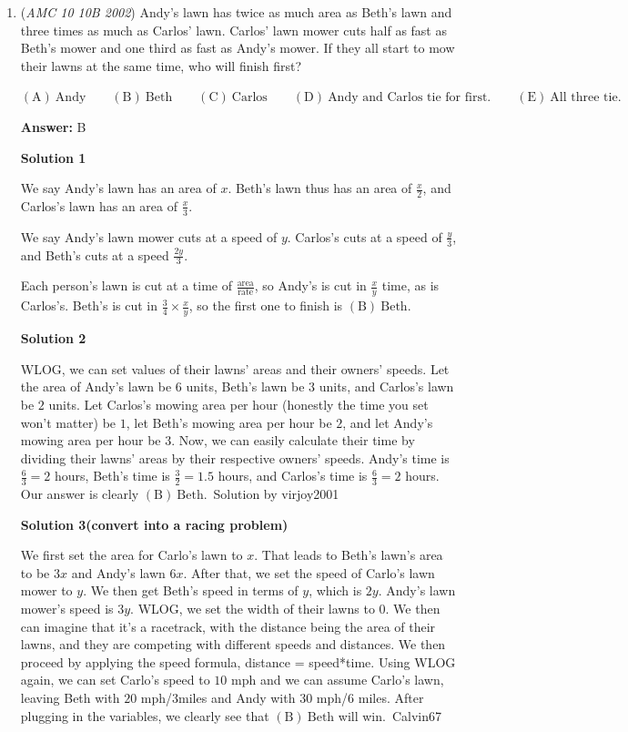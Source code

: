 \begin{enumerate}
 


	\item (\textit{AMC 10 10B 2002}) Andy's lawn has twice as much area as Beth's lawn and three times as much as Carlos' lawn. Carlos' lawn mower cuts half as fast as Beth's mower and one third as fast as Andy's mower. If they all start to mow their lawns at the same time, who will finish first?


 $\mathrm{(A) \ } \text{Andy}\qquad \mathrm{(B) \ } \text{Beth}\qquad \mathrm{(C) \ } \text{Carlos}\qquad \mathrm{(D) \ } \text{Andy and Carlos tie for first.}\qquad \mathrm{(E) \ } \text{All three tie.}$

 \textbf{Answer: }B



\textbf{Solution 1}

We say Andy's lawn has an area of $x$. Beth's lawn thus has an area of $\frac{x}{2}$, and Carlos's lawn has an area of $\frac{x}{3}$. 

 We say Andy's lawn mower cuts at a speed of $y$. Carlos's cuts at a speed of $\frac{y}{3}$, and Beth's cuts at a speed $\frac{2y}{3}$.

 Each person's lawn is cut at a time of $\frac{\text{area}}{\text{rate}}$, so Andy's is cut in $\frac{x}{y}$ time, as is Carlos's. Beth's is cut in $\frac{3}{4}\times\frac{x}{y}$, so the first one to finish is $\boxed{\mathrm{(B)}\ \text{Beth}}$.

 



\textbf{Solution 2}

WLOG, we can set values of their lawns' areas and their owners' speeds. Let the area of Andy's lawn be $6$ units, Beth's lawn be $3$ units, and Carlos's lawn be $2$ units. Let Carlos's mowing area per hour (honestly the time you set won't matter) be $1$, let Beth's mowing area per hour be $2$, and let Andy's mowing area per hour be $3$. Now, we can easily calculate their time  by dividing their lawns' areas by their respective owners' speeds. Andy's time is $\frac{6}{3} = 2$ hours, Beth's time is $\frac{3}{2} = 1.5$ hours, and Carlos's time is $\frac{6}{3} = 2$ hours. Our answer is clearly $\boxed{\mathrm{(B)}\ \text{Beth}}$.~Solution by virjoy2001

 



\textbf{Solution 3(convert into a racing problem)}

We first set the area for Carlo's lawn to $x$. That leads to Beth's lawn's area to be $3x$ and Andy's lawn $6x$. After that, we set the speed of Carlo's lawn mower to $y$. We then get Beth's speed in terms of $y$, which is $2y$. Andy's lawn mower's speed is $3y$. WLOG, we set the width of their lawns to $0$. We then can imagine that it's a racetrack, with the distance being the area of their lawns, and they are competing with different speeds and distances. We then proceed by applying the speed formula, distance = speed*time. Using WLOG again, we can set Carlo's speed to $10$ mph and we can assume Carlo's lawn, leaving Beth with $20$ mph/$3$miles and Andy with $30$ mph/$6$ miles. After plugging in the variables, we clearly see that $\boxed{\mathrm{(B)}\ \text{Beth}}$ will win.~Calvin67


\end{enumerate}
